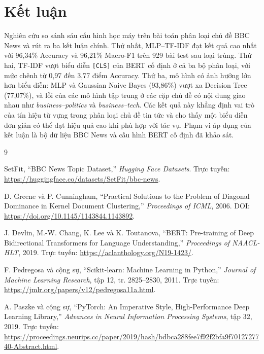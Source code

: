 \documentclass[conference,a4paper]{IEEEtran}
\begin{document}
\section{Kết luận}

Nghiên cứu so sánh sáu cấu hình học máy trên bài toán phân loại chủ đề BBC News và rút ra ba kết luận chính. Thứ nhất, MLP--TF-IDF đạt kết quả cao nhất với 96,34\% Accuracy và 96,21\% Macro-F1 trên 929 bài test sau loại trùng. Thứ hai, TF-IDF vượt biểu diễn \texttt{[CLS]} của BERT cố định ở cả ba bộ phân loại, với mức chênh từ 0,97 đến 3,77 điểm Accuracy. Thứ ba, mô hình có ảnh hưởng lớn hơn biểu diễn: MLP và Gaussian Naive Bayes (93,86\%) vượt xa Decision Tree (77,07\%), và lỗi của các mô hình tập trung ở các cặp chủ đề có nội dung giao nhau như \textit{business--politics} và \textit{business--tech}. Các kết quả này khẳng định vai trò của tín hiệu từ vựng trong phân loại chủ đề tin tức và cho thấy một biểu diễn đơn giản có thể đạt hiệu quả cao khi phù hợp với tác vụ. Phạm vi áp dụng của kết luận là bộ dữ liệu BBC News và cấu hình BERT cố định đã khảo sát.

\begin{thebibliography}{9}

SetFit, ``BBC News Topic Dataset,'' \textit{Hugging Face Datasets}. Trực tuyến: \url{https://huggingface.co/datasets/SetFit/bbc-news}.

D. Greene và P. Cunningham, ``Practical Solutions to the Problem of Diagonal Dominance in Kernel Document Clustering,'' \textit{Proceedings of ICML}, 2006. DOI: \url{https://doi.org/10.1145/1143844.1143892}.

J. Devlin, M.-W. Chang, K. Lee và K. Toutanova, ``BERT: Pre-training of Deep Bidirectional Transformers for Language Understanding,'' \textit{Proceedings of NAACL-HLT}, 2019. Trực tuyến: \url{https://aclanthology.org/N19-1423/}.

F. Pedregosa và cộng sự, ``Scikit-learn: Machine Learning in Python,'' \textit{Journal of Machine Learning Research}, tập 12, tr. 2825--2830, 2011. Trực tuyến: \url{https://jmlr.org/papers/v12/pedregosa11a.html}.

A. Paszke và cộng sự, ``PyTorch: An Imperative Style, High-Performance Deep Learning Library,'' \textit{Advances in Neural Information Processing Systems}, tập 32, 2019. Trực tuyến: \url{https://proceedings.neurips.cc/paper/2019/hash/bdbca288fee7f92f2bfa9f7012727740-Abstract.html}.

\end{thebibliography}
\end{document}
